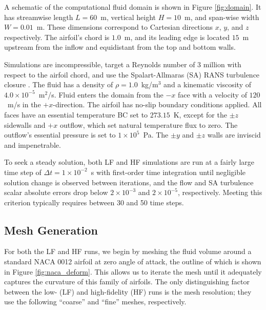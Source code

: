\documentclass[11pt]{article}
\begin{document}
A schematic of the computational fluid domain is shown in Figure \ref{fig:domain}. It has streamwise length $L = 60$~m, vertical height $H = 10$~m, and span-wise width $W = 0.01$~m. These dimensions correspond to Cartesian directions $x$, $y$, and $z$ respectively. The airfoil's chord is $1.0$~m, and its leading edge is located $15$~m upstream from the inflow and equidistant from the top and bottom walls.

Simulations are incompressible, target a Reynolds number of 3 million with respect to the airfoil chord, and use the Spalart-Allmaras (SA) RANS turbulence closure \citep{spalart1992}. The fluid has a density of $\rho = 1.0$~kg/m$^3$ and a kinematic viscosity of $4.0 \times 10^{-5}$~m$^2$/s. Fluid enters the domain from the $-x$ face with a velocity of $120$~m/s in the $+x$-direction. The airfoil has no-slip boundary conditions applied. All faces have an essential temperature BC set to $273.15$~K, except for the $\pm z$ sidewalls and $+x$ outflow, which set natural temperature flux to zero. The outflow's essential pressure is set to $1\times 10^{5}$~Pa. The $\pm y$ and $\pm z$ walls are inviscid and impenetrable.

To seek a steady solution, both LF and HF simulations are run at a fairly large time step of $\Delta t = 1 \times 10^{-2}$~s with first-order time integration until negligible solution change is observed between iterations, and the flow and SA turbulence scalar absolute errors drop below $2 \times 10^{-3}$ and $2 \times 10^{-5}$, respectively. Meeting this criterion typically requires between 30 and 50 time steps.

\subsection{Mesh Generation}

For both the LF and HF runs, we begin by meshing the fluid volume around a standard NACA 0012 airfoil at zero angle of attack, the outline of which is shown in Figure \ref{fig:naca_deform}. This allows us to iterate the mesh until it adequately captures the curvature of this family of airfoils. The only distinguishing factor between the low- (LF) and high-fidelity (HF) runs is the mesh resolution; they use the following ``coarse'' and ``fine'' meshes, respectively.
\end{document}
